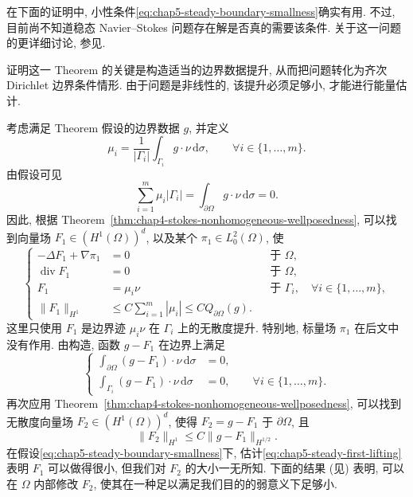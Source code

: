 在下面的证明中, 小性条件\eqref{eq:chap5-steady-boundary-smallness}确实有用. 不过, 目前尚不知道稳态 Navier--Stokes 问题存在解是否真的需要该条件. 关于这一问题的更详细讨论, 参见.

证明这一 Theorem 的关键是构造适当的边界数据提升, 从而把问题转化为齐次 Dirichlet 边界条件情形. 由于问题是非线性的, 该提升必须足够小, 才能进行能量估计.

考虑满足 Theorem 假设的边界数据 $g$, 并定义
\[
 \mu_i=\frac1{|\Gamma_i|}\int_{\Gamma_i}g\cdot\nu\,\mathrm d\sigma,
 \qquad\forall i\in\{1,\ldots,m\}.
\]
由假设可见
\[
 \sum_{i=1}^m\mu_i|\Gamma_i|
 =\int_{\partial\Omega}g\cdot\nu\,\mathrm d\sigma=0.
\]
因此, 根据 Theorem~\ref{thm:chap4-stokes-nonhomogeneous-wellposedness}, 可以找到向量场 $F_1\in(H^1(\Omega))^d$, 以及某个 $\pi_1\in L_0^2(\Omega)$, 使
\begin{equation}
\left\{
\begin{aligned}
 -\Delta F_1+\nabla\pi_1&=0&&\text{于 }\Omega,\\
 \operatorname{div}F_1&=0&&\text{于 }\Omega,\\
 F_1&=\mu_i\nu&&\text{于 }\Gamma_i,\quad\forall i\in\{1,\ldots,m\},\\
 \|F_1\|_{H^1}&\leq C\sum_{i=1}^m|\mu_i|
 \leq C Q_{\partial\Omega}(g).
\end{aligned}
\right.
\label{eq:chap5-steady-first-lifting}
\end{equation}
这里只使用 $F_1$ 是边界迹 $\mu_i\nu$ 在 $\Gamma_i$ 上的无散度提升. 特别地, 标量场 $\pi_1$ 在后文中没有作用. 由构造, 函数 $g-F_1$ 在边界上满足
\begin{equation}
\left\{
\begin{aligned}
 \int_{\partial\Omega}(g-F_1)\cdot\nu\,\mathrm d\sigma&=0,\\
 \int_{\Gamma_i}(g-F_1)\cdot\nu\,\mathrm d\sigma&=0,
 \qquad\forall i\in\{1,\ldots,m\}.
\end{aligned}
\right.
\label{eq:chap5-steady-lifting-flux}
\end{equation}
再次应用 Theorem~\ref{thm:chap4-stokes-nonhomogeneous-wellposedness}, 可以找到无散度向量场 $F_2\in(H^1(\Omega))^d$, 使得 $F_2=g-F_1$ 于 $\partial\Omega$, 且
\[
 \|F_2\|_{H^1}\leq C\|g-F_1\|_{H^{1/2}}.
\]
在假设\eqref{eq:chap5-steady-boundary-smallness}下, 估计\eqref{eq:chap5-steady-first-lifting}表明 $F_1$ 可以做得很小, 但我们对 $F_2$ 的大小一无所知. 下面的结果 (见) 表明, 可以在 $\Omega$ 内部修改 $F_2$, 使其在一种足以满足我们目的的弱意义下足够小.

